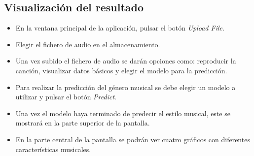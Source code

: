 

\subsection{Visualización del resultado}

\begin{itemize}
\tightlist

\item En la ventana principal de la aplicación, pulsar el botón \textit{Upload File}.
\item Elegir el fichero de audio en el almacenamiento.
\item Una vez subido el fichero de audio se darán opciones como: reproducir la canción, visualizar datos básicos y elegir el modelo para la predicción.
\item Para realizar la predicción del género musical se debe elegir un modelo a utilizar y pulsar el botón \textit{Predict}.
\item Una vez el modelo haya terminado de predecir el estilo musical, este se mostrará en la parte superior de la pantalla.
\item En la parte central de la pantalla se podrán ver cuatro gráficos con diferentes características musicales.

\end{itemize}




